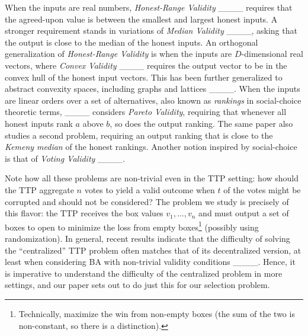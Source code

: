When the inputs are real numbers, \emph{Honest-Range Validity} ____ requires that the agreed-upon value is between the smallest and largest honest inputs. A stronger requirement stands in variations of \emph{Median Validity} ____, asking that the output is close to the median of the honest inputs. An orthogonal generalization of \emph{Honest-Range Validity} is when the inputs are $D$-dimensional real vectors, where \emph{Convex Validity} ____ requires the output vector to be in the convex hull of the honest input vectors. This has been further generalized to abstract convexity spaces, including graphs and lattices ____. When the inputs are linear orders over a set of alternatives, also known as \emph{rankings} in social-choice theoretic terms, ____ considers \emph{Pareto Validity}, requiring that whenever all honest inputs rank $a$ above $b$, so does the output ranking. The same paper also studies a second problem, requiring an output ranking that is close to the \emph{Kemeny median} of the honest rankings. Another notion inspired by social-choice is that of \emph{Voting Validity} ____.

Note how all these problems are non-trivial even in the TTP setting: how should the TTP aggregate $n$ votes to yield a valid outcome when $t$ of the votes might be corrupted and should not be considered? The problem we study is precisely of this flavor: the TTP receives the box values $v_1, \dots, v_n$ and must output a set of boxes to open to minimize the loss from empty boxes\footnote{Technically, maximize the win from non-empty boxes (the sum of the two is non-constant, so there is a distinction).} (possibly using randomization). In general, recent results indicate that the difficulty of solving the ``centralized'' TTP problem often matches that of its decentralized version, at least when considering BA with non-trivial validity conditions ____. Hence, it is imperative to understand the difficulty of the centralized problem in more settings, and our paper sets out to do just this for our selection problem.

